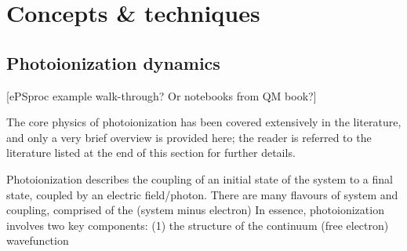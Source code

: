 \section{Concepts \& techniques}

\subsection{Photoionization dynamics} 
[ePSproc example walk-through? Or notebooks from QM book?]

The core physics of photoionization has been covered extensively in the literature, and only a very brief overview is provided here; the reader is referred to the literature listed at the end of this section for further details.

Photoionization describes the coupling of an initial state of the system to a final state, coupled by an electric field/photon. There are many flavours of system and coupling, 
comprised of the (system minus electron)  In essence, photoionization involves two key components: (1) the structure of the continuum (free electron) wavefunction 